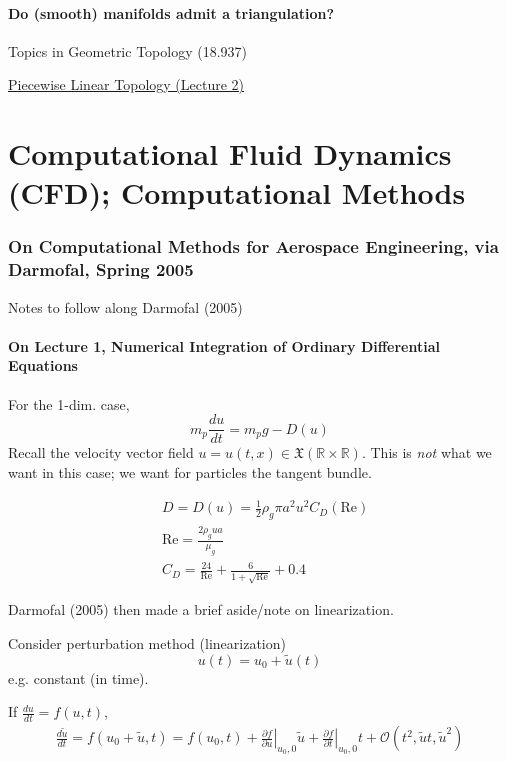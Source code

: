 \documentclass[10pt]{amsart}
\begin{document}
\begin{multicols*}{2}
\subsection{Do (smooth) manifolds admit a triangulation?}

Topics in Geometric Topology (18.937)


\href{http://www.math.harvard.edu/~lurie/937notes/937Lecture2.pdf}{Piecewise Linear Topology (Lecture 2)}

\part{Computational Fluid Dynamics (CFD); Computational Methods} 

\section{On Computational Methods for Aerospace Engineering, via Darmofal, Spring 2005}

Notes to follow along Darmofal (2005) \cite{Darm2005}

\subsection{On Lecture 1, Numerical Integration of Ordinary Differential Equations}

For the 1-dim. case,
\[
m_p \frac{du}{dt} = m_pg - D(u)
\]
Recall the velocity vector field $u=u(t,x) \in \mathfrak{X}(\mathbb{R}\times \mathbb{R})$.  This is \emph{not} what we want in this case; we want for particles the tangent bundle.

\[
\begin{aligned}
  & D = D(u) = \frac{1}{2} \rho_g \pi a^2 u^2 C_D(\text{Re}) \\ 
  & \text{Re} = \frac{2\rho_g u a}{\mu_g} \\
  & C_D = \frac{24}{\text{Re}} + \frac{6}{1+ \sqrt{\text{Re}} } + 0.4
\end{aligned}
\]

Darmofal (2005) \cite{Darm2005} then made a brief aside/note on linearization.

Consider perturbation method (linearization)
\[
u(t) = u_0 + \widetilde{u}(t)
\]
e.g. constant (in time).

If $\frac{du}{dt} = f(u,t)$,
\[
\begin{gathered}
  \frac{d\widetilde{u}}{dt} = f(u_0 + \widetilde{u},t) = f(u_0,t) + \left. \frac{ \partial f}{ \partial u} \right|_{u_0,0} \widetilde{u} + \left. \frac{ \partial f}{ \partial t} \right|_{u_0,0} t + \mathcal{O}(t^2, \widetilde{u}t, \widetilde{u}^2 )
  \end{gathered}
\]


\end{multicols*}
\end{document}
